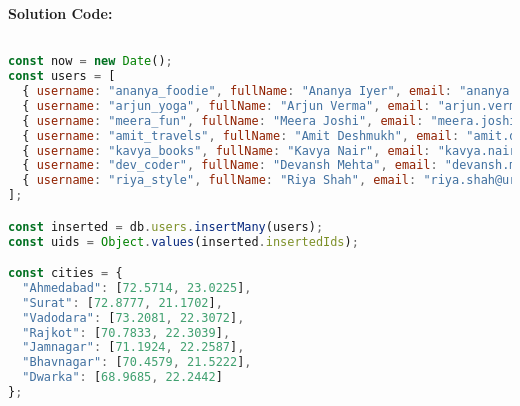 \documentclass[12pt,a4paper]{article}
\begin{document}
\textbf{Solution Code:}
\begin{lstlisting}[language=JavaScript]

const now = new Date();
const users = [
  { username: "ananya_foodie", fullName: "Ananya Iyer", email: "ananya.iyer@urbanwave.in", age: 23, bio: "Food lover & home cook", interests: ["food","cooking","travel"], location: { type: "Point", coordinates: cities["Vadodara"], city: "Vadodara", state:"Gujarat" }, screenTime: 95, followersCount: 120, followingCount: 80, isActive: true, createdAt: now, lastSeen: now },
  { username: "arjun_yoga", fullName: "Arjun Verma", email: "arjun.verma@urbanwave.in", age: 28, bio: "Yoga & wellness", interests: ["fitness","health","sports"], location: { type: "Point", coordinates: cities["Rajkot"], city: "Rajkot", state:"Gujarat" }, screenTime: 80, followersCount: 85, followingCount: 90, isActive: true, createdAt: now, lastSeen: now },
  { username: "meera_fun", fullName: "Meera Joshi", email: "meera.joshi@urbanwave.in", age: 22, bio: "Making people laugh", interests: ["comedy","entertainment","memes"], location: { type: "Point", coordinates: cities["Ahmedabad"], city: "Ahmedabad", state:"Gujarat" }, screenTime: 200, followersCount: 250, followingCount: 60, isActive: true, createdAt: now, lastSeen: now },
  { username: "amit_travels", fullName: "Amit Deshmukh", email: "amit.deshmukh@urbanwave.in", age: 30, bio: "Travel photographer", interests: ["travel","photography","nature"], location: { type: "Point", coordinates: cities["Surat"], city: "Surat", state:"Gujarat" }, screenTime: 110, followersCount: 320, followingCount: 150, isActive: true, createdAt: now, lastSeen: now },
  { username: "kavya_books", fullName: "Kavya Nair", email: "kavya.nair@urbanwave.in", age: 26, bio: "Books & learning", interests: ["education","books","learning"], location: { type: "Point", coordinates: cities["Jamnagar"], city: "Jamnagar", state:"Gujarat" }, screenTime: 150, followersCount: 42, followingCount: 30, isActive: true, createdAt: now, lastSeen: now },
  { username: "dev_coder", fullName: "Devansh Mehta", email: "devansh.mehta@urbanwave.in", age: 24, bio: "Coding & gadgets", interests: ["technology","coding","gadgets"], location: { type: "Point", coordinates: cities["Bhavnagar"], city: "Bhavnagar", state:"Gujarat" }, screenTime: 180, followersCount: 60, followingCount: 110, isActive: true, createdAt: now, lastSeen: now },
  { username: "riya_style", fullName: "Riya Shah", email: "riya.shah@urbanwave.in", age: 21, bio: "Fashion & lifestyle", interests: ["fashion","beauty","lifestyle"], location: { type: "Point", coordinates: cities["Vadodara"], city: "Vadodara", state:"Gujarat" }, screenTime: 250, followersCount: 410, followingCount: 190, isActive: true, createdAt: now, lastSeen: now }
];

const inserted = db.users.insertMany(users);
const uids = Object.values(inserted.insertedIds); 

const cities = {
  "Ahmedabad": [72.5714, 23.0225],
  "Surat": [72.8777, 21.1702],
  "Vadodara": [73.2081, 22.3072],
  "Rajkot": [70.7833, 22.3039],
  "Jamnagar": [71.1924, 22.2587],
  "Bhavnagar": [70.4579, 21.5222],
  "Dwarka": [68.9685, 22.2442]
};

\end{lstlisting}
\end{document}
